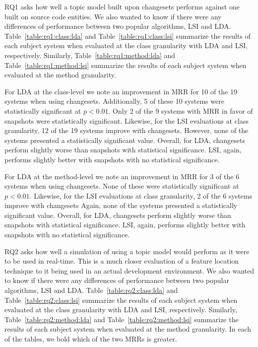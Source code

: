 




RQ1 asks how well a topic model built upon changesets performs against
one built on source code entities.
We also wanted to know if there were any differences of performance
between two popular algorithms, LSI and LDA.
Table~\ref{table:rq1:class:lda} and Table~\ref{table:rq1:class:lsi}
summarize the results of each subject system when
evaluated at the class granularity with LDA and LSI, respectively.
Similarly, Table~\ref{table:rq1:method:lda} and Table~\ref{table:rq1:method:lsi}
summarize the results of each subject system when
evaluated at the method granularity.

For LDA at the class-level we note an improvement in MRR for 10 of the 19 systems when using changesets.
Additionally, 5 of these 10 systems were statistically significant at $p<0.01$.
Only 2 of the 9 systems with MRR in favor of snapshots were statistically significant.
Likewise, for the LSI evaluations at class granularity, 12 of the 19 systems improve with changesets.
However, none of the systems presented a statistically significant value.
Overall, for LDA, changesets perform slightly worse than snapshots with statistical significance.
LSI, again, performs slightly better with snapshots with no statistical significance.

For LDA at the method-level we note an improvement in MRR for 3 of the 6 systems when using changesets.
None of these were statistically significant at $p<0.01$.
Likewise, for the LSI evaluations at class granularity, 2 of the 6 systems improve with changesets
Again, none of the systems presented a statistically significant value.
Overall, for LDA, changesets perform slightly worse than snapshots with statistical significance.
LSI, again, performs slightly better with snapshots with no statistical significance.







RQ2 asks how well a simulation of using a topic model would perform as it were to be used in real-time.
This is a much closer evaluation of a feature location technique to it being used in an actual development environment.
We also wanted to know if there were any differences of performance between two popular algorithms, LSI and LDA.
Table~\ref{table:rq2:class:lda} and Table~\ref{table:rq2:class:lsi} summarize the results of each subject system when
evaluated at the class granularity with LDA and LSI, respectively.
Similarly, Table~\ref{table:rq2:method:lda} and Table~\ref{table:rq2:method:lsi}
summarize the results of each subject system when evaluated at the method granularity.
In each of the tables, we bold which of the two MRRs is greater.

